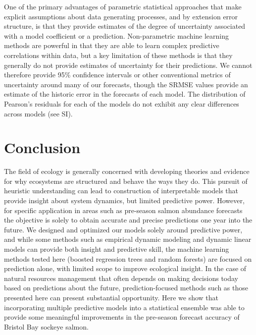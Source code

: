 \documentclass[
]{article}
\begin{document}
One of the primary advantages of parametric statistical approaches that make explicit assumptions about data generating processes, and by extension error structure, is that they provide estimates of the degree of uncertainty associated with a model coefficient or a prediction. Non-parametric machine learning methods are powerful in that they are able to learn complex predictive correlations within data, but a key limitation of these methods is that they generally do not provide estimates of uncertainty for their predictions. We cannot therefore provide 95\% confidence intervals or other conventional metrics of uncertainty around many of our forecasts, though the SRMSE values provide an estimate of the historic error in the forecasts of each model. The distribution of Pearson's residuals for each of the models do not exhibit any clear differences across models (see SI).

\hypertarget{conclusion}{%
\section{Conclusion}\label{conclusion}}

The field of ecology is generally concerned with developing theories and evidence for why ecosystems are structured and behave the ways they do. This pursuit of heuristic understanding can lead to construction of interpretable models that provide insight about system dynamics, but limited predictive power. However, for specific application in areas such as pre-season salmon abundance forecasts the objective is solely to obtain accurate and precise predictions one year into the future. We designed and optimized our models solely around predictive power, and while some methods such as empirical dynamic modeling and dynamic linear models can provide both insight and predictive skill, the machine learning methods tested here (boosted regression trees and random forests) are focused on prediction alone, with limited scope to improve ecological insight. In the case of natural resources management that often depends on making decisions today based on predictions about the future, prediction-focused methods such as those presented here can present substantial opportunity. Here we show that incorporating multiple predictive models into a statistical ensemble was able to provide some meaningful improvements in the pre-season forecast accuracy of Bristol Bay sockeye salmon.
\end{document}
